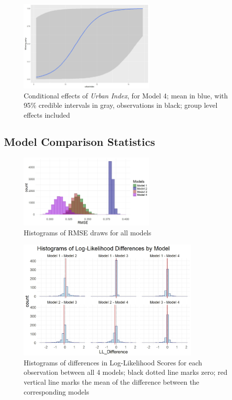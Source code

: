\documentclass[12pt]{article}
\begin{document}
\begin{figure}[h!]
	\centering
	\caption{Conditional effects of \textit{Urban Index}, for Model 4; mean in blue, with 95\% credible intervals in gray, observations in black;  group level effects included}
	\label{fig:cond_eff_mod4}
	\includegraphics[width=0.6\textwidth]{results/cond_eff_urb_model4_groupeff_nopoints.jpeg}
	
\end{figure}



\FloatBarrier
\subsection*{Model Comparison Statistics}


\begin{figure}[h!]
	\centering
	\caption{Histograms of RMSE draws for all models}
	\label{fig:rmse}
	\includegraphics[width=0.6\textwidth]{model_comp_figures/RMSE_all.jpeg}
	
\end{figure}

\begin{figure}[h!]
	\centering
	\caption{Histograms of differences in Log-Likelihood Scores for each observation between all 4 models; black dotted line marks zero; red vertical line marks the mean of the difference between the corresponding models}
	\label{fig:ll_diff}
	\includegraphics[width=0.8\textwidth]{model_comp_figures/LL_differences.jpeg}
	
\end{figure}
\end{document}
